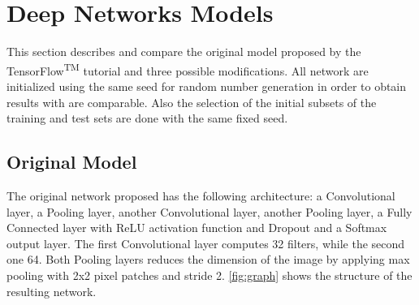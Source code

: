 \section{Deep Networks Models}
\label{sec:models}

This section describes and compare the original model proposed by the TensorFlow\textsuperscript{TM} tutorial and three possible modifications.
All network are initialized using the same seed for random number generation in order to obtain results with are comparable.
Also the selection of the initial subsets of the training and test sets are done with the same fixed seed.


\subsection{Original Model}

The original network proposed has the following architecture:
a Convolutional layer, a Pooling layer, another Convolutional layer, another Pooling layer, a Fully Connected layer with \ac{ReLU} activation function and Dropout and a Softmax output layer.
The first Convolutional layer computes 32 filters, while the second one 64.
Both Pooling layers reduces the dimension of the image by applying max pooling with 2x2 pixel patches and stride 2.
\cref{fig:graph} shows the structure of the resulting network.

